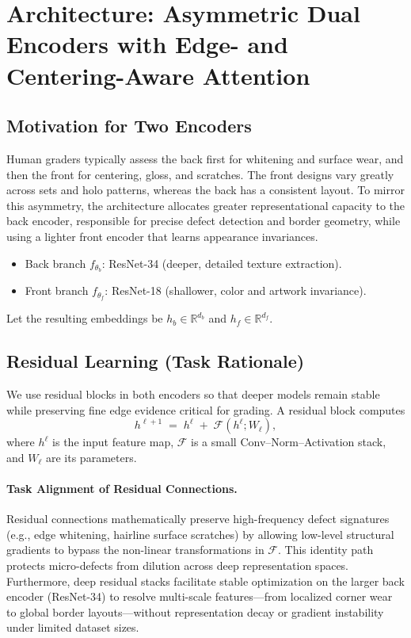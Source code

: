 \documentclass[12pt]{article}
\begin{document}
\section{Architecture: Asymmetric Dual Encoders with Edge- and Centering-Aware Attention}

\subsection{Motivation for Two Encoders}
Human graders typically assess the back first for whitening and surface wear, and then the front for centering, gloss, and scratches. 
The front designs vary greatly across sets and holo patterns, whereas the back has a consistent layout. 
To mirror this asymmetry, the architecture allocates greater representational capacity to the back encoder, responsible for precise defect detection and border geometry, while using a lighter front encoder that learns appearance invariances.

\begin{itemize}
    \item Back branch $f_{\theta_b}$: ResNet-34 (deeper, detailed texture extraction).
    \item Front branch $f_{\theta_f}$: ResNet-18 (shallower, color and artwork invariance).
\end{itemize}
Let the resulting embeddings be $h_b \in \mathbb{R}^{d_b}$ and $h_f \in \mathbb{R}^{d_f}$.

\subsection{Residual Learning (Task Rationale)}
\label{subsec:residual-learning}

We use residual blocks in both encoders so that deeper models remain stable while preserving fine edge evidence critical for grading.
A residual block computes
\[
h^{\ell+1} \;=\; h^\ell \;+\; \mathcal{F}\!\left(h^\ell; W_\ell\right),
\]
where $h^\ell$ is the input feature map, $\mathcal{F}$ is a small Conv–Norm–Activation stack, and $W_\ell$ are its parameters.

\paragraph{Task Alignment of Residual Connections.}
Residual connections mathematically preserve high-frequency defect signatures (e.g., edge whitening, hairline surface scratches) by allowing low-level structural gradients to bypass the non-linear transformations in $\mathcal{F}$. 
This identity path protects micro-defects from dilution across deep representation spaces. 
Furthermore, deep residual stacks facilitate stable optimization on the larger back encoder (ResNet-34) to resolve multi-scale features—from localized corner wear to global border layouts—without representation decay or gradient instability under limited dataset sizes.
\end{document}
